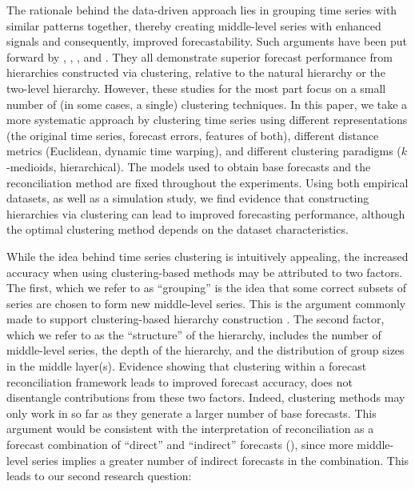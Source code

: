 \documentclass[a4paper,review,12pt,authoryear]{elsarticle}
\begin{document}
The rationale behind the data-driven approach lies in grouping time series with similar patterns together, thereby creating middle-level series with enhanced signals and consequently, improved forecastability. Such arguments have been put forward by  \cite{pangHierarchicalElectricityTime2018}, \cite{liForecastReconciliationApproach2019}, \cite{pangHierarchicalElectricityTime2022}, and \cite{matteraImprovingOutofSampleForecasts2023}. They all demonstrate superior forecast performance from hierarchies constructed via clustering, relative to the natural hierarchy or the two-level hierarchy. However, these studies for the most part focus on a small number of (in some cases, a single) clustering techniques. In this paper, we take a more systematic approach by clustering time series using different representations (the original time series, forecast errors, features of both), different distance metrics (Euclidean, dynamic time warping), and different clustering paradigms ($k$-medioids, hierarchical). The models used to obtain base forecasts and the reconciliation method are fixed throughout the experiments. Using both empirical datasets, as well as a simulation study, we find evidence that constructing hierarchies via clustering can lead to improved forecasting performance, although the optimal clustering method depends on the dataset characteristics.%

While the idea behind time series clustering is intuitively appealing, the increased accuracy when using clustering-based methods may be attributed to two factors. The first, which we refer to as     ``grouping'' is the idea that some correct subsets of series are chosen to form new middle-level series. This is the argument commonly made to support clustering-based hierarchy construction \citep[see \textit{e.g.}][]{liForecastReconciliationApproach2019, pangHierarchicalElectricityTime2022, matteraImprovingOutofSampleForecasts2023}.  
The second factor, which we refer to as the ``structure'' of the hierarchy, includes the number of middle-level series, the depth of the hierarchy, and the distribution of group sizes in the middle layer(s). Evidence showing that clustering within a forecast reconciliation framework leads to improved forecast accuracy, does not disentangle contributions from these two factors. Indeed, clustering methods may only work in so far as they generate a larger number of base forecasts. This argument would be consistent with the interpretation of reconciliation as a forecast combination of ``direct'' and ``indirect'' forecasts (\citealp{hollymanUnderstandingForecastReconciliation2021}), since more middle-level series implies a greater number of indirect forecasts in the combination. This leads to our second research question:
\end{document}
